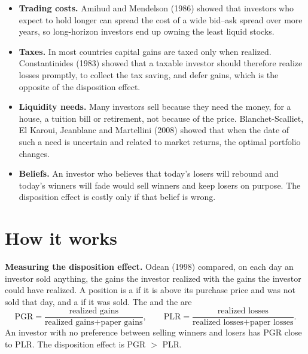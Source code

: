 \begin{itemize}
  \item \textbf{Trading costs.} Amihud and Mendelson (1986) showed that investors who expect to hold longer can spread the cost of a wide bid--ask spread over more years, so long-horizon investors end up owning the least liquid stocks. 
  \item \textbf{Taxes.} In most countries capital gains are taxed only when realized. Constantinides (1983) showed that a taxable investor should therefore realize losses promptly, to collect the tax saving, and defer gains, which is the opposite of the disposition effect.
  \item \textbf{Liquidity needs.} Many investors sell because they need the money, for a house, a tuition bill or retirement, not because of the price. Blanchet-Scalliet, El Karoui, Jeanblanc and Martellini (2008) showed that when the date of such a need is uncertain and related to market returns, the optimal portfolio changes.
  \item \textbf{Beliefs.} An investor who believes that today's losers will rebound and today's winners will fade would sell winners and keep losers on purpose. The disposition effect is costly only if that belief is wrong.
\end{itemize}


\section{How it works}
\label{sec:hp-how}

\textbf{Measuring the disposition effect.} Odean (1998) compared, on each day an investor sold anything, the gains the investor realized with the gains the investor could have realized. A position is a  if it is above its purchase price and was not sold that day, and a  if it was sold. The  and the  are
\begin{equation}
  \text{PGR} = \frac{\text{realized gains}}{\text{realized gains} + \text{paper gains}} , \qquad
  \text{PLR} = \frac{\text{realized losses}}{\text{realized losses} + \text{paper losses}} .
  \label{eq:hp-pgr}
\end{equation}
An investor with no preference between selling winners and losers has PGR close to PLR. The disposition effect is PGR $>$ PLR.

